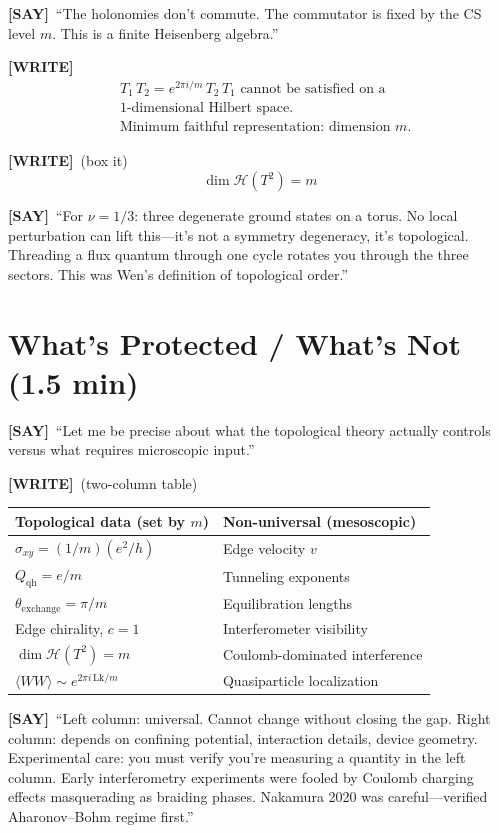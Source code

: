 \documentclass[11pt]{article}
\newcommand{\WRITE}{\textcolor{writecol}{\textbf{[WRITE]}}}
\newcommand{\SAY}{\textcolor{saycol}{\textbf{[SAY]}}}
\begin{document}
\SAY\ ``The holonomies don't commute. The commutator is fixed by the CS level $m$. This is a finite Heisenberg algebra.''

\WRITE
\begin{align*}
&T_1\,T_2 = e^{2\pi i/m}\,T_2\,T_1 \text{ cannot be satisfied on a}\\
&\text{1-dimensional Hilbert space.}\\[4pt]
&\text{Minimum faithful representation: dimension }m.
\end{align*}

\WRITE\ {\large (box it)}
\begin{equation*}
\boxed{\dim\mathcal{H}(T^2) = m}
\end{equation*}

\SAY\ ``For $\nu = 1/3$: three degenerate ground states on a torus. No local perturbation can lift this---it's not a symmetry degeneracy, it's topological. Threading a flux quantum through one cycle rotates you through the three sectors. This was Wen's definition of topological order.''

\section{What's Protected / What's Not (1.5 min)}

\SAY\ ``Let me be precise about what the topological theory actually controls versus what requires microscopic input.''

\WRITE\ (two-column table)
\begin{center}
\begin{tabular}{@{}l|l@{}}
\textbf{Topological data (set by $m$)} & \textbf{Non-universal (mesoscopic)} \\
\midrule
$\sigma_{xy} = (1/m)(e^2/h)$ & Edge velocity $v$ \\
$Q_{\mathrm{qh}} = e/m$ & Tunneling exponents \\
$\theta_{\mathrm{exchange}} = \pi/m$ & Equilibration lengths \\
Edge chirality, $c=1$ & Interferometer visibility \\
$\dim\mathcal{H}(T^2) = m$ & Coulomb-dominated interference \\
$\langle WW\rangle \sim e^{2\pi i\,\mathrm{Lk}/m}$ & Quasiparticle localization \\
\end{tabular}
\end{center}

\SAY\ ``Left column: universal. Cannot change without closing the gap. Right column: depends on confining potential, interaction details, device geometry. Experimental care: you must verify you're measuring a quantity in the left column. Early interferometry experiments were fooled by Coulomb charging effects masquerading as braiding phases. Nakamura 2020 was careful---verified Aharonov--Bohm regime first.''
\end{document}
